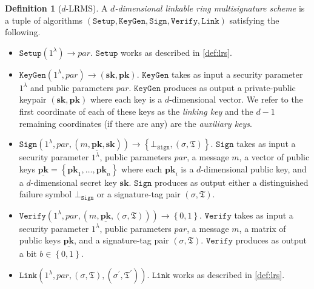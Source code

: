 \documentclass{article}
\theoremstyle{plain}
\theoremstyle{definition}
\newtheorem{defn}{Definition}[section]
\begin{document}
\begin{defn}[$d$-LRMS]
A \textit{$d$-dimensional linkable ring multisignature scheme} is a tuple of algorithms $(\texttt{Setup}, \texttt{KeyGen}, \texttt{Sign}, \texttt{Verify}, \texttt{Link})$ satisfying the following. 
\begin{itemize}
\item $\texttt{Setup}(1^\lambda) \to \textit{par}$. $\texttt{Setup}$ works as described in \ref{def:lrs}. 

\item $\texttt{KeyGen}(1^\lambda, \textit{par}) \to (\textbf{sk}, \textbf{pk})$. $\texttt{KeyGen}$ takes as input a security parameter $1^\lambda$ and public parameters $\textit{par}$. $\texttt{KeyGen}$ produces as output a private-public keypair $(\textbf{sk}, \textbf{pk})$ where each key is a $d$-dimensional vector. We refer to the first coordinate of each of these keys as the \textit{linking key} and the $d-1$ remaining coordinates (if there are any) are the \textit{auxiliary keys}.

\item $\texttt{Sign}\left(1^\lambda, \textit{par}, (m, \underline{\textbf{pk}}, \textbf{sk})\right) \to \left\{\bot_{\texttt{Sign}}, (\sigma, \mathfrak{T})\right\}$. $\texttt{Sign}$ takes as input a security parameter $1^\lambda$, public parameters $\textit{par}$, a message $m$, a vector of public keys $\underline{\textbf{pk}} = \left\{\textbf{pk}_1, \ldots, \textbf{pk}_n\right\}$ where each $\textbf{pk}_i$ is a $d$-dimensional public key, and a $d$-dimensional secret key $\textbf{sk}$. $\texttt{Sign}$ produces as output either a distinguished failure symbol $\bot_{\texttt{Sign}}$ or a signature-tag pair $(\sigma, \mathfrak{T})$. 

\item $\texttt{Verify}\left(1^\lambda, \textit{par}, (m, \underline{\textbf{pk}}, (\sigma, \mathfrak{T}))\right) \rightarrow \left\{0,1\right\}$. $\texttt{Verify}$ takes as input a security parameter $1^\lambda$, public parameters $\textit{par}$, a message $m$, a matrix of public keys $\underline{\textbf{pk}}$, and a signature-tag pair $(\sigma, \mathfrak{T})$. $\texttt{Verify}$ produces as output a bit $b \in \left\{0,1\right\}$. 

\item  $\texttt{Link}\left(1^\lambda, \textit{par}, (\sigma, \mathfrak{T}), (\sigma^\prime, \mathfrak{T}^\prime)\right)$. $\texttt{Link}$ works as described in \ref{def:lrs}.
\end{itemize}
\end{defn}
\end{document}
